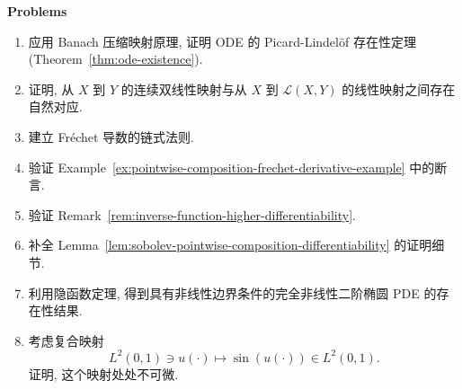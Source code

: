 \textbf{Problems}

\begin{enumerate}[label=\thesection.\arabic*.,ref=\thesection.\arabic*,start=1,series=book-problems]

\item\label{ex:banach-contraction-picard-lindelof-existence} 应用 Banach 压缩映射原理, 证明 ODE 的 Picard-Lindelöf 存在性定理 (Theorem~\ref{thm:ode-existence}).

\item\label{ex:continuous-bilinear-linear-operator-correspondence} 证明, 从 $X$ 到 $Y$ 的连续双线性映射与从 $X$ 到 $\mathcal{L}(X,Y)$ 的线性映射之间存在自然对应.

\item\label{ex:frechet-derivative-chain-rule} 建立 Fréchet 导数的链式法则.

\item\label{ex:pointwise-composition-frechet-derivative} 验证 Example~\ref{ex:pointwise-composition-frechet-derivative-example} 中的断言.

\item\label{ex:inverse-function-higher-differentiability} 验证 Remark~\ref{rem:inverse-function-higher-differentiability}.

\item\label{ex:sobolev-composition-lemma-details} 补全 Lemma~\ref{lem:sobolev-pointwise-composition-differentiability} 的证明细节.

\item\label{ex:implicit-function-fully-nonlinear-elliptic-boundary-problems} 利用隐函数定理, 得到具有非线性边界条件的完全非线性二阶椭圆 PDE 的存在性结果.

\item\label{ex:sine-composition-ltwo-nowhere-differentiability} 考虑复合映射\[L^2(0,1)\ni u(\cdot)\mapsto\sin(u(\cdot))\in L^2(0,1).\]证明, 这个映射处处不可微.

\end{enumerate}
